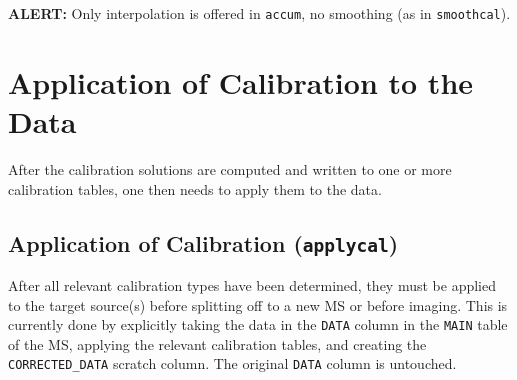 {\bf ALERT:} Only interpolation is offered in {\tt accum},
no smoothing (as in {\tt smoothcal}).

\section{Application of Calibration to the Data}
\label{section:cal.correct}

After the calibration solutions are computed and written to
one or more calibration tables, one then needs to apply them to the data.

\subsection{Application of Calibration ({\tt applycal})}
\label{section:cal.correct.apply}

After all relevant calibration types have been determined, they must
be applied to the target source(s) before splitting off to a new
MS or before imaging.  This is currently done by explicitly taking the
data in the {\tt DATA} column in the {\tt MAIN} table of the MS, 
applying the relevant calibration tables, and creating the 
{\tt CORRECTED\_DATA} scratch column.  The original {\tt DATA}
column is untouched.

